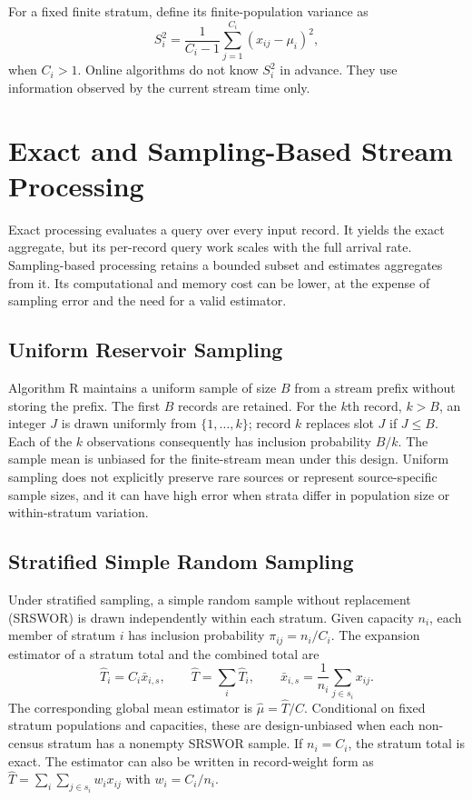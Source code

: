 \documentclass[11pt]{article}
\begin{document}
For a fixed finite stratum, define its finite-population variance as
\begin{equation}
 S_i^2 = \frac{1}{C_i-1}\sum_{j=1}^{C_i}(x_{ij}-\mu_i)^2,
\end{equation}
when $C_i>1$. Online algorithms do not know $S_i^2$ in advance. They use information observed by the current stream time only.

\section{Exact and Sampling-Based Stream Processing}

Exact processing evaluates a query over every input record. It yields the exact aggregate, but its per-record query work scales with the full arrival rate. Sampling-based processing retains a bounded subset and estimates aggregates from it. Its computational and memory cost can be lower, at the expense of sampling error and the need for a valid estimator.

\subsection{Uniform Reservoir Sampling}

Algorithm R maintains a uniform sample of size $B$ from a stream prefix without storing the prefix. The first $B$ records are retained. For the $k$th record, $k>B$, an integer $J$ is drawn uniformly from $\{1,\ldots,k\}$; record $k$ replaces slot $J$ if $J\le B$. Each of the $k$ observations consequently has inclusion probability $B/k$. The sample mean is unbiased for the finite-stream mean under this design. Uniform sampling does not explicitly preserve rare sources or represent source-specific sample sizes, and it can have high error when strata differ in population size or within-stratum variation.

\subsection{Stratified Simple Random Sampling}

Under stratified sampling, a simple random sample without replacement (SRSWOR) is drawn independently within each stratum. Given capacity $n_i$, each member of stratum $i$ has inclusion probability $\pi_{ij}=n_i/C_i$. The expansion estimator of a stratum total and the combined total are
\begin{equation}
 \widehat{T}_i=C_i\bar{x}_{i,s},\qquad
 \widehat{T}=\sum_i\widehat{T}_i,
 \qquad
 \bar{x}_{i,s}=\frac{1}{n_i}\sum_{j\in s_i}x_{ij}.
\end{equation}
The corresponding global mean estimator is $\widehat{\mu}=\widehat{T}/C$. Conditional on fixed stratum populations and capacities, these are design-unbiased when each non-census stratum has a nonempty SRSWOR sample. If $n_i=C_i$, the stratum total is exact. The estimator can also be written in record-weight form as $\widehat{T}=\sum_i\sum_{j\in s_i}w_i x_{ij}$ with $w_i=C_i/n_i$.
\end{document}
